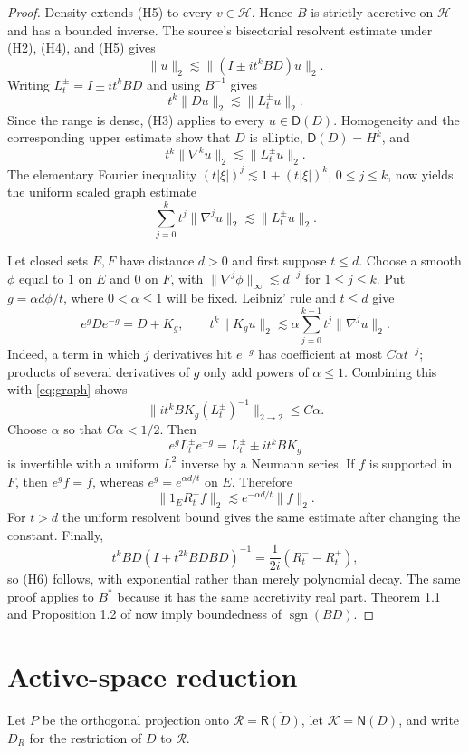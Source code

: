 \documentclass[11pt]{article}
\newcommand{\Hh}{\mathcal H}
\newcommand{\Rr}{\mathcal R}
\newcommand{\Kk}{\mathcal K}
\newcommand{\Dom}{\mathsf D}
\newcommand{\Ran}{\mathsf R}
\newcommand{\Ker}{\mathsf N}
\newcommand{\sgn}{\operatorname{sgn}}
\begin{document}
\begin{proof}
Density extends (H5) to every $v\in\Hh$. Hence $B$ is strictly accretive on
$\Hh$ and has a bounded inverse. The source's bisectorial resolvent estimate
under (H2), (H4), and (H5) gives
\[
 \|u\|_2\lesssim\|(I\pm i t^kBD)u\|_2.
\]
Writing $L_t^\pm=I\pm i t^kBD$ and using $B^{-1}$ gives
\[
 t^k\|Du\|_2\lesssim\|L_t^\pm u\|_2.
\]
Since the range is dense, (H3) applies to every $u\in\Dom(D)$. Homogeneity
and the corresponding upper estimate show that $D$ is elliptic,
$\Dom(D)=H^k$, and
\[
 t^k\|\nabla^ku\|_2\lesssim\|L_t^\pm u\|_2.
\]
The elementary Fourier inequality
$(t|\xi|)^j\lesssim1+(t|\xi|)^k$, $0\leq j\leq k$, now yields the uniform
scaled graph estimate
\begin{equation}\label{eq:graph}
 \sum_{j=0}^k t^j\|\nabla^ju\|_2
 \lesssim \|L_t^\pm u\|_2.
\end{equation}

Let closed sets $E,F$ have distance $d>0$ and first suppose $t\leq d$.
Choose a smooth $\phi$ equal to $1$ on $E$ and $0$ on $F$, with
$\|\nabla^j\phi\|_\infty\lesssim d^{-j}$ for $1\leq j\leq k$. Put
$g=\alpha d\phi/t$, where $0<\alpha\leq1$ will be fixed. Leibniz' rule and
$t\leq d$ give
\[
 e^gDe^{-g}=D+K_g,
 \qquad
 t^k\|K_gu\|_2
 \lesssim \alpha\sum_{j=0}^{k-1}t^j\|\nabla^ju\|_2.
\]
Indeed, a term in which $j$ derivatives hit $e^{-g}$ has coefficient at most
$C\alpha t^{-j}$; products of several derivatives of $g$ only add powers of
$\alpha\leq1$. Combining this with \eqref{eq:graph} shows
\[
 \|i t^kB K_g(L_t^\pm)^{-1}\|_{2\to2}\leq C\alpha.
\]
Choose $\alpha$ so that $C\alpha<1/2$. Then
\[
 e^gL_t^\pm e^{-g}=L_t^\pm\pm i t^kB K_g
\]
is invertible with a uniform $L^2$ inverse by a Neumann series. If
$f$ is supported in $F$, then $e^gf=f$, whereas $e^g=e^{\alpha d/t}$ on
$E$. Therefore
\[
 \|1_E R_t^\pm f\|_2\lesssim e^{-\alpha d/t}\|f\|_2.
\]
For $t>d$ the uniform resolvent bound gives the same estimate after changing
the constant. Finally,
\[
 t^kBD(I+t^{2k}BDBD)^{-1}
   =\frac{1}{2i}(R_t^- -R_t^+),
\]
so (H6) follows, with exponential rather than merely polynomial decay. The
same proof applies to $B^*$ because it has the same accretivity real part.
Theorem 1.1 and Proposition 1.2 of \cite{AAM} now imply boundedness of
$\sgn(BD)$.
\end{proof}

\section*{Active-space reduction}
Let $P$ be the orthogonal projection onto
$\Rr=\overline{\Ran(D)}$, let $\Kk=\Ker(D)$, and write $D_R$ for the
restriction of $D$ to $\Rr$.
\end{document}
